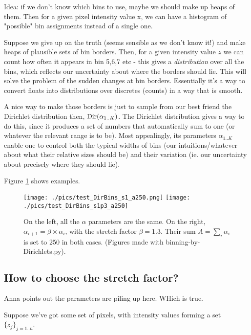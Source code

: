 \documentclass[11pt]{article}
\begin{document}
Idea: if we don't know which bins to use, maybe we should make up
heaps of them. Then for a given pixel intensity value x, we can have a
histogram of "possible" bin assignments instead of a single one.


Suppose we give up on the truth (seems sensible as we don't know it!)
and make heaps of plausible sets of bin borders. Then, for a given
intensity value $z$ we can count how often it appears in bin 5,6,7 etc
- this gives a {\it distribution} over all the bins, which reflects
our uncertainty about where the borders should lie. This will solve
the problem of the sudden changes at bin borders. Essentially it's a
way to convert floats into distributions over discretes (counts) in a
way that is smooth.

A nice way to make those borders is just to sample from our best
friend the Dirichlet distribution then, $\text{Dir}(\alpha_{1..K})$.  The
Dirichlet distribution gives a way to do this, since it produces a set
of numbers that automatically sum to one (or whatever the relevant
range is to be). Most appealingly, its parameters $\alpha_{1..K}$ enable one
to control both the typical widths of bins (our intuitions/whatever
about what their relative sizes should be) and their variation
(ie. our uncertainty about precisely where they should lie).

Figure \ref{fig:test_DirBins} shows examples.

\begin{figure}
\begin{center}
\texttt{[image: ./pics/test\_DirBins\_s1\_a250.png]}
\texttt{[image: ./pics/test\_DirBins\_s1p3\_a250]}
\caption{\label{fig:test_DirBins} On the left, all the $\alpha$
  parameters are the same.  On the right, $\alpha_{i+1} = \beta \times
  \alpha_{i} $, with the stretch factor $\beta = 1.3$. Their sum $A
  =\sum_i\alpha_i$ is set to 250 in both cases.  (Figures made with
  binning-by-Dirichlets.py).}
\end{center}
\end{figure}

\subsection{How to choose the stretch factor?}
Anna points out the parameters are piling up here. WHich is true.

Suppose we've got some set of pixels, with intensity values forming a
set $\{z_j\}_{j=1..n}$.
\end{document}
